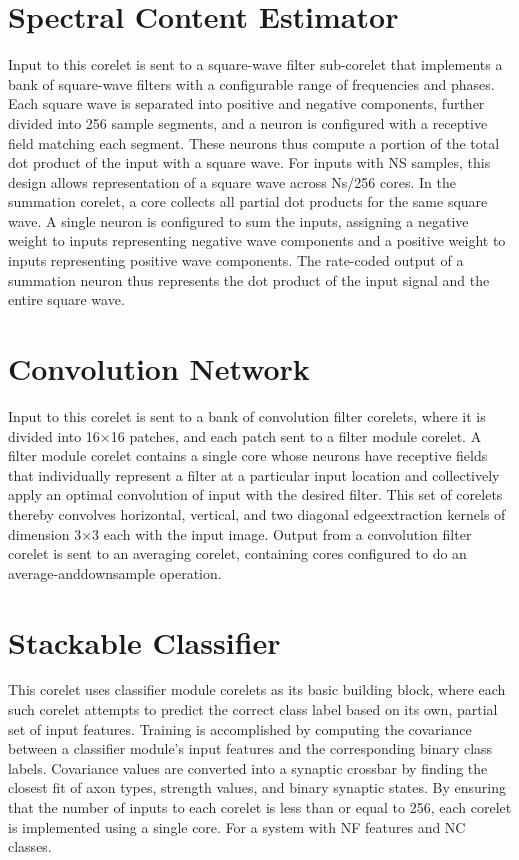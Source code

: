 \section{Spectral Content Estimator}
\hspace{2em} Input to this corelet is sent
to a square-wave filter sub-corelet that implements a bank of
square-wave filters with a configurable range of frequencies
and phases. Each square wave is separated into positive
and negative components, further divided into 256 sample
segments, and a neuron is configured with a receptive field
matching each segment. These neurons thus compute a portion
of the total dot product of the input with a square wave.
For inputs with NS samples, this design allows representation
of a square wave across Ns/256  cores. In the summation
corelet, a core collects all partial dot products for the same
square wave. A single neuron is configured to sum the inputs,
assigning a negative weight to inputs representing negative
wave components and a positive weight to inputs representing
positive wave components. The rate-coded output of a summation
neuron thus represents the dot product of the input signal
and the entire square wave.

\section{Convolution Network}
\hspace{2em} Input to this corelet is sent to a
bank of convolution filter corelets, where it is divided into
16$\times$16 patches, and each patch sent to a filter module corelet.
A filter module corelet contains a single core whose neurons
have receptive fields that individually represent a filter at a
particular input location and collectively apply an optimal
convolution of input with the desired filter. This set of corelets
thereby convolves horizontal, vertical, and two diagonal edgeextraction
kernels of dimension 3$\times$3 each with the input image.
Output from a convolution filter corelet is sent to an averaging
corelet, containing cores configured to do an average-anddownsample
operation.

\section{Stackable Classifier}
\hspace{2em} This corelet uses classifier module
corelets as its basic building block, where each such corelet
attempts to predict the correct class label based on its own,
partial set of input features. Training is accomplished by
computing the covariance between a classifier module's input
features and the corresponding binary class labels. Covariance
values are converted into a synaptic crossbar by finding the
closest fit of axon types, strength values, and binary synaptic
states. By ensuring that the number of inputs to each corelet
is less than or equal to 256, each corelet is implemented using
a single core. For a system with NF features and NC classes.

